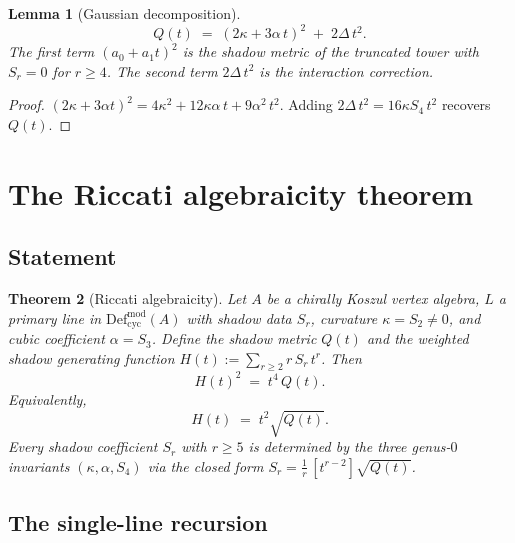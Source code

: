 \documentclass[11pt]{article}
\theoremstyle{plain}
\newtheorem{theorem}{Theorem}[section]
\newtheorem{lemma}[theorem]{Lemma}
\theoremstyle{definition}
\theoremstyle{remark}
\newcommand{\Defcyc}{\mathrm{Def}_{\mathrm{cyc}}}
\begin{document}
\begin{lemma}[Gaussian decomposition]
\label{lem:gaussian}
\begin{equation}\label{eq:gaussian-decomp}
 Q(t)
 \;=\;
 (2\kappa + 3\alpha\,t)^2
 \;+\;
 2\Delta\,t^2.
\end{equation}
The first term $(a_0 + a_1 t)^2$ is the shadow metric of
the truncated tower with $S_r = 0$ for $r \geq 4$.
The second term $2\Delta\,t^2$ is the interaction correction.
\end{lemma}

\begin{proof}
$(2\kappa + 3\alpha t)^2 = 4\kappa^2 + 12\kappa\alpha\,t
+ 9\alpha^2\,t^2$.
Adding $2\Delta\,t^2 = 16\kappa S_4\,t^2$ recovers $Q(t)$.
\end{proof}



\section{The Riccati algebraicity theorem}
\label{sec:algebraicity}

\subsection{Statement}

\begin{theorem}[Riccati algebraicity]
\label{thm:riccati}
Let $A$ be a chirally Koszul vertex algebra, $L$ a primary line
in $\Defcyc^{\mathrm{mod}}(A)$ with shadow data $S_r$, curvature
$\kappa = S_2 \neq 0$, and cubic coefficient $\alpha = S_3$.
Define the shadow metric $Q(t)$ and the weighted shadow
generating function $H(t) := \sum_{r \geq 2} r\,S_r\,t^r$.
Then
\begin{equation}\label{eq:algebraicity}
 H(t)^2 \;=\; t^4\,Q(t).
\end{equation}
Equivalently,
\begin{equation}\label{eq:closed-form}
 H(t)
 \;=\;
 t^2\sqrt{Q(t)}.
\end{equation}
Every shadow coefficient $S_r$ with $r \geq 5$ is determined by
the three genus-$0$ invariants $(\kappa, \alpha, S_4)$ via the
closed form $S_r = \frac{1}{r}\,[t^{r-2}]\sqrt{Q(t)}$.
\end{theorem}


\subsection{The single-line recursion}
\end{document}
